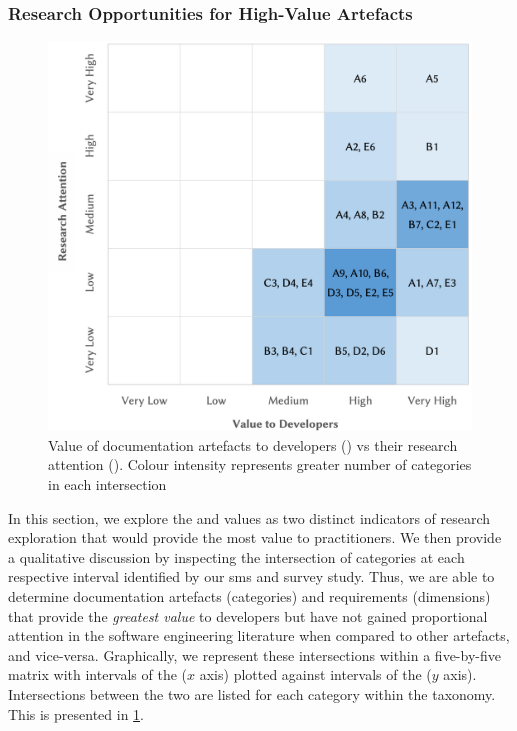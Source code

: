 \subsubsection{Research Opportunities for High-Value Artefacts}
\label{tse2020:sec:tax-analysis:ips-vs-ils}

\begin{figure}[h]
	\centering
  \includegraphics[width=.8\linewidth]{ips-vs-ils.png}
  \caption[Comparing value of API documentation artefacts to developers vs research attention]{Value of  documentation artefacts to developers () vs their research attention (). Colour intensity represents greater number of categories in each intersection}
  \label{tse2020:fig:ips-vs-ils}
\end{figure}

In this section, we explore the  and  values as two distinct indicators of research exploration that would provide the most value to practitioners. We then provide a qualitative discussion by inspecting the intersection of categories at each respective interval identified by our \gls{sms} and survey study. Thus, we are able to determine documentation artefacts (categories) and requirements (dimensions) that provide the \textit{greatest value} to developers but have not gained proportional attention in the software engineering literature when compared to other artefacts, and vice-versa. Graphically, we represent these intersections within a five-by-five matrix with intervals of the  ($x$ axis) plotted against intervals of the  ($y$ axis). Intersections between the two are listed for each category within the taxonomy. This is presented in \cref{tse2020:fig:ips-vs-ils}.

